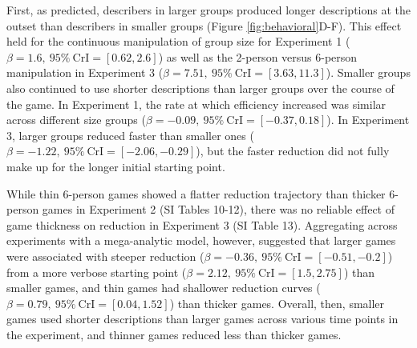 \documentclass[
  english,
]{article}
\begin{document}
First, as predicted, describers in larger groups produced longer descriptions at the outset than describers in smaller groups (Figure \ref{fig:behavioral}D-F).
This effect held for the continuous manipulation of group size for Experiment 1 (\(\beta=1.6,\:95\%\:\mathrm{CrI}=[0.62, 2.6]\)) as well as the 2-person versus 6-person manipulation in Experiment 3 (\(\beta=7.51,\:95\%\:\mathrm{CrI}=[3.63, 11.3]\)).
Smaller groups also continued to use shorter descriptions than larger groups over the course of the game.
In Experiment 1, the rate at which efficiency increased was similar across different size groups (\(\beta=-0.09,\:95\%\:\mathrm{CrI}=[-0.37, 0.18]\)).
In Experiment 3, larger groups reduced faster than smaller ones (\(\beta=-1.22,\:95\%\:\mathrm{CrI}=[-2.06, -0.29]\)), but the faster reduction did not fully make up for the longer initial starting point.

While thin 6-person games showed a flatter reduction trajectory than thicker 6-person games in Experiment 2 (SI Tables 10-12), there was no reliable effect of game thickness on reduction in Experiment 3 (SI Table 13).
Aggregating across experiments with a mega-analytic model, however, suggested that larger games were associated with steeper reduction (\(\beta=-0.36,\:95\%\:\mathrm{CrI}=[-0.51, -0.2]\)) from a more verbose starting point (\(\beta=2.12,\:95\%\:\mathrm{CrI}=[1.5, 2.75]\)) than smaller games, and thin games had shallower reduction curves (\(\beta=0.79,\:95\%\:\mathrm{CrI}=[0.04, 1.52]\)) than thicker games.
Overall, then, smaller games used shorter descriptions than larger games across various time points in the experiment, and thinner games reduced less than thicker games.
\end{document}

